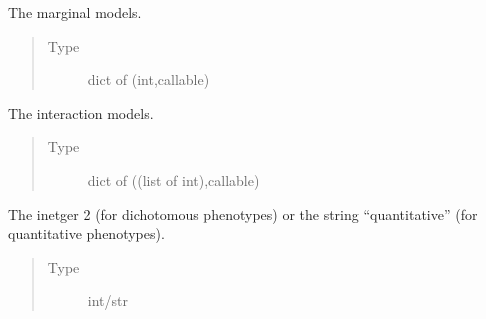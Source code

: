 \documentclass[a4paper,10pt,english]{sphinxhowto}
\begin{document}
\begin{fulllineitems}
\begin{fulllineitems}
\begin{quote}
\begin{description}
\end{description}\end{quote}

\end{fulllineitems}


\begin{fulllineitems}
\label{\detokenize{utils:utils.parametrized_model.ParametrizedModel.marginal_models}}
The marginal models.
\begin{quote}\begin{description}
\item[{Type}] \leavevmode
dict of (int,callable)

\end{description}\end{quote}

\end{fulllineitems}


\begin{fulllineitems}
\label{\detokenize{utils:utils.parametrized_model.ParametrizedModel.interaction_models}}
The interaction models.
\begin{quote}\begin{description}
\item[{Type}] \leavevmode
dict of ((list of int),callable)

\end{description}\end{quote}

\end{fulllineitems}


\begin{fulllineitems}
\label{\detokenize{utils:utils.parametrized_model.ParametrizedModel.phenotype}}
The inetger 2 (for dichotomous phenotypes) or the
string “quantitative” (for quantitative phenotypes).
\begin{quote}\begin{description}
\item[{Type}] \leavevmode
int/str


\end{description}
\end{quote}
\end{fulllineitems}
\end{fulllineitems}
\end{document}
